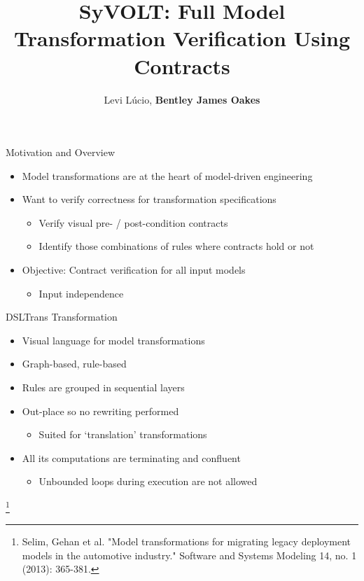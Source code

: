 \documentclass[xcolor=dvipsnames, 12pt, handout]{beamer}
\title[SyVOLT]{SyVOLT: Full Model Transformation Verification Using Contracts}
\author[Lucio, Oakes]{Levi L\'{u}cio, \textbf{Bentley James Oakes}}
\institute[]{McGill University, Montreal\\fortiss, Munich}
\newcommand\blfootnote[1]{%
  \begingroup
  \renewcommand\thefootnote{}\footnote{#1}%
  \addtocounter{footnote}{-1}%
  \endgroup
}
\begin{document}
\maketitle


\begin{frame}{Motivation and Overview}
\begin{itemize}[<+->]
\item Model transformations are at the heart of model-driven engineering
\item Want to verify correctness for transformation specifications
\begin{itemize}[<+->]
\item Verify visual pre- / post-condition contracts
\item Identify those combinations of rules where contracts hold or not
\end{itemize}
\item Objective: Contract verification for all input models
\begin{itemize}
\item Input independence
\end{itemize}
\end{itemize}
\end{frame}






\begin{frame}{DSLTrans Transformation}

\begin{itemize}[<+->]
\item Visual language for model transformations

\item Graph-based, rule-based

\item Rules are grouped in sequential layers
\item Out-place so no rewriting performed
\begin{itemize}
\item Suited for `translation' transformations
\end{itemize}
\item All its computations are terminating and confluent
\begin{itemize}
\item Unbounded loops during execution are not allowed
\end{itemize}


\end{itemize}

\blfootnote{Selim, Gehan et al. "Model transformations for migrating legacy deployment models in the automotive industry." Software and Systems Modeling 14, no. 1 (2013): 365-381.}

\end{frame}
\end{document}
